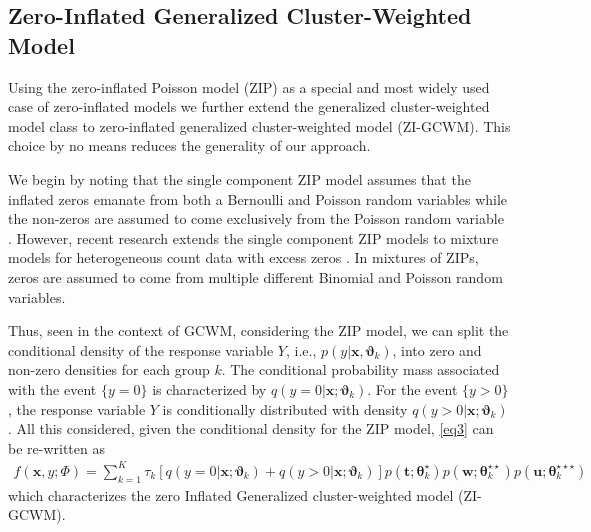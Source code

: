 \documentclass[12pt,letterpaper]{article}
\numberwithin{equation}{section}
\numberwithin{equation}{section}
\numberwithin{equation}{section}
\begin{document}

\subsection{Zero-Inflated Generalized Cluster-Weighted Model}%

Using the zero-inflated Poisson model (ZIP) as a special and most widely used case of zero-inflated models we further extend the generalized cluster-weighted model class to zero-inflated generalized cluster-weighted model (ZI-GCWM). This choice by no means reduces the generality of our approach. 

We begin by noting that the single component ZIP model assumes that the inflated zeros emanate from both a Bernoulli and Poisson random variables while the non-zeros are assumed to come exclusively from the Poisson random variable  \citep[see][]{Lambert}. However, recent research  extends the single component ZIP models to mixture models for heterogeneous count data with excess zeros \citep[see][]{Bermudez+Karlis:2012}. In mixtures of ZIPs, zeros are assumed to come from multiple different Binomial and Poisson random variables. 

Thus, seen in the context of GCWM, considering the ZIP model, we can split the conditional density of the response variable $Y$, i.e., $p(y|\bm{x},\bm{\vartheta}_k)$, into zero and non-zero densities for each group $k$. The conditional probability mass associated with the event $\{y=0\}$ is characterized by $q(y = 0|\bm{x};\bm{\vartheta}_{k})$. For the event $\{y > 0\}$, the response variable $Y$ is conditionally distributed with density $q(y > 0|\bm{x}; \bm{\vartheta}_{k} )$. All this considered, given the conditional density for the ZIP model, \eqref{eq3} can be re-written as
 \begin{align}
 f(\bm x, y; \Phi)= \sum_{k=1}^{K} \tau_k \left[ q(y = 0|\bm{x};\bm{\vartheta}_{k} ) +  q(y > 0|\bm{x} ; \bm{\vartheta}_{k}  ) \right]   p(\bm{t};\bm{\theta}_k^{\star})p(\bm{w};\bm{\theta}_k^{\star\star})p(\bm{u};\bm{\theta}_k^{\star\star\star})
\end{align}
which characterizes the zero Inflated Generalized cluster-weighted model (ZI-GCWM).
\end{document}
